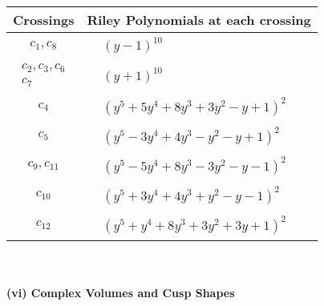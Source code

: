 \documentclass[1p]{elsarticle_modified}
\theoremstyle{definition}
\begin{document}
\begin{tabular}{m{50pt}|m{274pt}}
Crossings & \hspace{64pt}Riley Polynomials at each crossing \\
\hline $$\begin{aligned}c_{1},c_{8}\end{aligned}$$&$\begin{aligned}
&(y-1)^{10}
\end{aligned}$\\
\hline $$\begin{aligned}c_{2},c_{3},c_{6}\\c_{7}\end{aligned}$$&$\begin{aligned}
&(y+1)^{10}
\end{aligned}$\\
\hline $$\begin{aligned}c_{4}\end{aligned}$$&$\begin{aligned}
&(y^5+5 y^4+8 y^3+3 y^2- y+1)^2
\end{aligned}$\\
\hline $$\begin{aligned}c_{5}\end{aligned}$$&$\begin{aligned}
&(y^5-3 y^4+4 y^3- y^2- y+1)^2
\end{aligned}$\\
\hline $$\begin{aligned}c_{9},c_{11}\end{aligned}$$&$\begin{aligned}
&(y^5-5 y^4+8 y^3-3 y^2- y-1)^2
\end{aligned}$\\
\hline $$\begin{aligned}c_{10}\end{aligned}$$&$\begin{aligned}
&(y^5+3 y^4+4 y^3+y^2- y-1)^2
\end{aligned}$\\
\hline $$\begin{aligned}c_{12}\end{aligned}$$&$\begin{aligned}
&(y^5+y^4+8 y^3+3 y^2+3 y+1)^2
\end{aligned}$\\
\hline
\end{tabular}\\~\\
\newpage\flushleft \textbf{(vi) Complex Volumes and Cusp Shapes}
\end{document}
